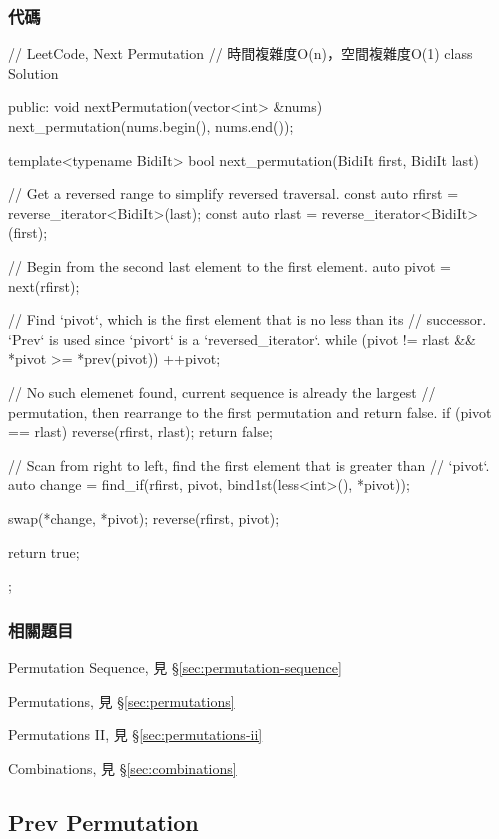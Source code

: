 \subsubsection{代碼}
\begin{Code}
// LeetCode, Next Permutation
// 時間複雜度O(n)，空間複雜度O(1)
class Solution {
public:
    void nextPermutation(vector<int> &nums) {
        next_permutation(nums.begin(), nums.end());
    }

    template<typename BidiIt>
    bool next_permutation(BidiIt first, BidiIt last) {
        // Get a reversed range to simplify reversed traversal.
        const auto rfirst = reverse_iterator<BidiIt>(last);
        const auto rlast = reverse_iterator<BidiIt>(first);

        // Begin from the second last element to the first element.
        auto pivot = next(rfirst);

        // Find `pivot`, which is the first element that is no less than its
        // successor.  `Prev` is used since `pivort` is a `reversed_iterator`.
        while (pivot != rlast && *pivot >= *prev(pivot))
            ++pivot;

        // No such elemenet found, current sequence is already the largest
        // permutation, then rearrange to the first permutation and return false.
        if (pivot == rlast) {
            reverse(rfirst, rlast);
            return false;
        }

        // Scan from right to left, find the first element that is greater than
        // `pivot`.
        auto change = find_if(rfirst, pivot, bind1st(less<int>(), *pivot));

        swap(*change, *pivot);
        reverse(rfirst, pivot);

        return true;
    }
};
\end{Code}


\subsubsection{相關題目}
\begindot
\item Permutation Sequence, 見 \S \ref{sec:permutation-sequence}
\item Permutations, 見 \S \ref{sec:permutations}
\item Permutations II, 見 \S \ref{sec:permutations-ii}
\item Combinations, 見 \S \ref{sec:combinations}
\myenddot

\subsection{Prev Permutation} %
\label{sec:prev-permutation}


